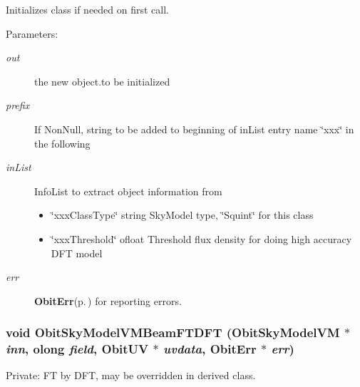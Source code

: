 Initializes class if needed on first call. \begin{Desc}
\item[Parameters:]
\begin{description}
\item[{\em out}]the new object.to be initialized \item[{\em prefix}]If Non\-Null, string to be added to beginning of in\-List entry name \char`\"{}xxx\char`\"{} in the following \item[{\em in\-List}]Info\-List to extract object information from \begin{itemize}
\item \char`\"{}xxx\-Class\-Type\char`\"{} string Sky\-Model type, \char`\"{}Squint\char`\"{} for this class \item \char`\"{}xxx\-Threshold\char`\"{} ofloat Threshold flux density for doing high accuracy DFT model \end{itemize}
\item[{\em err}]{\bf Obit\-Err}{\rm (p.\,\pageref{structObitErr})} for reporting errors. \end{description}
\end{Desc}
\subsubsection{\setlength{\rightskip}{0pt plus 5cm}void Obit\-Sky\-Model\-VMBeam\-FTDFT ({\bf Obit\-Sky\-Model\-VM} $\ast$ {\em inn}, {\bf olong} {\em field}, {\bf Obit\-UV} $\ast$ {\em uvdata}, {\bf Obit\-Err} $\ast$ {\em err})}\label{ObitSkyModelVMBeam_8c_a5}


Private: FT by DFT, may be overridden in derived class. 

